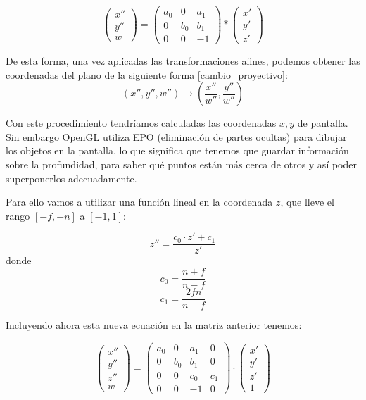 \documentclass[a4paper,11pt, oneside]{book}
\begin{document}
$$\begin{pmatrix}
x''\\
y''\\
w
\end{pmatrix}=
\begin{pmatrix}
	a_0 & 0&a_1\\
	0&b_0&b_1\\
	0&0&-1
\end{pmatrix}*
\begin{pmatrix}
x'\\
y'\\
z'
\end{pmatrix}
$$


De esta forma, una vez aplicadas las transformaciones afines, podemos obtener las coordenadas del plano de la siguiente forma \ref{cambio_proyectivo}:
\begin{equation}
(x'',y'',w'') \rightarrow (\frac{x''}{w''}, \frac{y''}{w''})
\end{equation}


Con este procedimiento tendríamos calculadas las coordenadas $x,y$ de pantalla. Sin embargo OpenGL utiliza EPO (eliminación de partes ocultas) para dibujar los objetos en la pantalla, lo que significa que tenemos que guardar información sobre la profundidad, para saber qué puntos están más cerca de otros y así poder superponerlos adecuadamente. 

Para ello vamos a  utilizar una función lineal en la coordenada $z$, que lleve el rango $[-f,-n]$ a $[-1,1]$:

\begin{equation}
z'' = \frac{c_0\cdot z'+c_1}{-z'}
\end{equation}
donde
\begin{equation}
c_0 = \frac{n+f}{n-f}
\end{equation}
\begin{equation}
c_1 = \frac{2fn}{n-f}
\end{equation}

Incluyendo ahora esta nueva ecuación en la matriz anterior tenemos:

$$\begin{pmatrix}
x''\\
y''\\
z'' \\
w
\end{pmatrix}=
\begin{pmatrix}
a_0 & 0&a_1&0\\
0&b_0&b_1&0\\
0&0&c_0&c_1\\
0&0&-1&0
\end{pmatrix}\cdot 
\begin{pmatrix}
x'\\
y'\\
z'\\
1
\end{pmatrix}
$$
\end{document}
